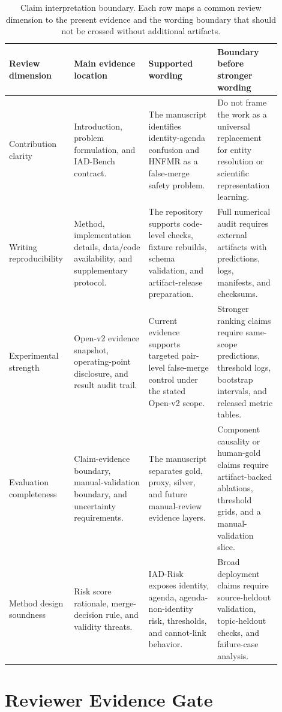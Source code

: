 \documentclass[11pt]{article}
\begin{document}
\begin{table}[H]
\caption{Claim interpretation boundary. Each row maps a common review dimension to the present evidence and the wording boundary that should not be crossed without additional artifacts.}
\label{tab:claim-interpretation-boundary}
\centering
\footnotesize
\setlength{\tabcolsep}{3pt}
\begin{tabular}{L{0.18\linewidth}L{0.26\linewidth}L{0.24\linewidth}L{0.22\linewidth}}
\toprule
Review dimension & Main evidence location & Supported wording & Boundary before stronger wording \\
\midrule
Contribution clarity & Introduction, problem formulation, and IAD-Bench contract. & The manuscript identifies identity-agenda confusion and HNFMR as a false-merge safety problem. & Do not frame the work as a universal replacement for entity resolution or scientific representation learning. \\
Writing reproducibility & Method, implementation details, data/code availability, and supplementary protocol. & The repository supports code-level checks, fixture rebuilds, schema validation, and artifact-release preparation. & Full numerical audit requires external artifacts with predictions, logs, manifests, and checksums. \\
Experimental strength & Open-v2 evidence snapshot, operating-point disclosure, and result audit trail. & Current evidence supports targeted pair-level false-merge control under the stated Open-v2 scope. & Stronger ranking claims require same-scope predictions, threshold logs, bootstrap intervals, and released metric tables. \\
Evaluation completeness & Claim-evidence boundary, manual-validation boundary, and uncertainty requirements. & The manuscript separates gold, proxy, silver, and future manual-review evidence layers. & Component causality or human-gold claims require artifact-backed ablations, threshold grids, and a manual-validation slice. \\
Method design soundness & Risk score rationale, merge-decision rule, and validity threats. & IAD-Risk exposes identity, agenda, agenda-non-identity risk, thresholds, and cannot-link behavior. & Broad deployment claims require source-heldout validation, topic-heldout checks, and failure-case analysis. \\
\bottomrule
\end{tabular}
\end{table}

\section{Reviewer Evidence Gate}
\end{document}
